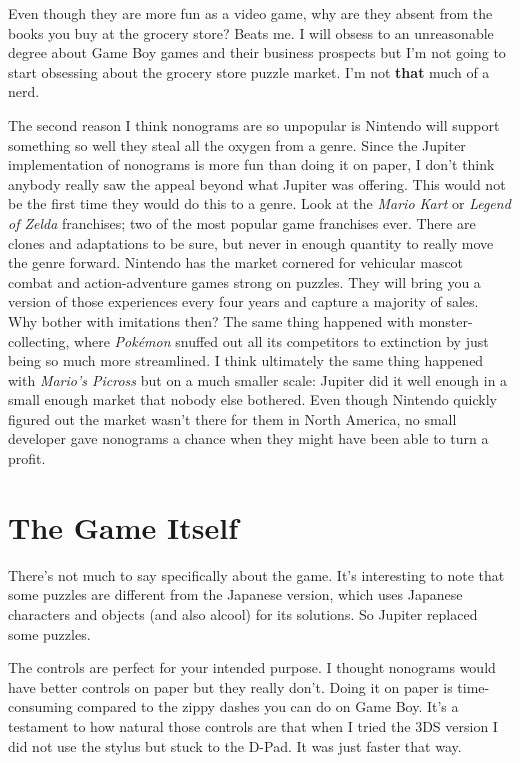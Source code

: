 \documentclass{book}
\begin{document}
Even though they are more fun as a video game, why are they absent from the books you buy at the grocery store? Beats me. I will obsess to an unreasonable degree about Game Boy games and their business prospects but I’m not going to start obsessing about the grocery store puzzle market. I’m not \textbf{that} much of a nerd.\par
The second reason I think nonograms are so unpopular is Nintendo will support something so well they steal all the oxygen from a genre. Since the Jupiter implementation of nonograms is more fun than doing it on paper, I don’t think anybody really saw the appeal beyond what Jupiter was offering. This would not be the first time they would do this to a genre. Look at the \emph{Mario Kart} or \emph{Legend of Zelda} franchises; two of the most popular game franchises ever. There are clones and adaptations to be sure, but never in enough quantity to really move the genre forward. Nintendo has the market cornered for vehicular mascot combat and action-adventure games strong on puzzles. They will bring you a version of those experiences every four years and capture a majority of sales. Why bother with imitations then? The same thing happened with monster-collecting, where \emph{Pokémon} snuffed out all its competitors to extinction by just being so much more streamlined. I think ultimately the same thing happened with \emph{Mario’s Picross} but on a much smaller scale: Jupiter did it well enough in a small enough market that nobody else bothered. Even though Nintendo quickly figured out the market wasn’t there for them in North America, no small developer gave nonograms a chance when they might have been able to turn a profit.\par
\FloatBarrier\section*{The Game Itself}
There’s not much to say specifically about the game. It’s interesting to note that some puzzles are different from the Japanese version, which uses Japanese characters and objects (and also alcool) for its solutions. So Jupiter replaced some puzzles.\par
The controls are perfect for your intended purpose. I thought nonograms would have better controls on paper but they really don’t. Doing it on paper is time-consuming compared to the zippy dashes you can do on Game Boy. It’s a testament to how natural those controls are that when I tried the 3DS version I did not use the stylus but stuck to the D-Pad. It was just faster that way.\par
\end{document}
